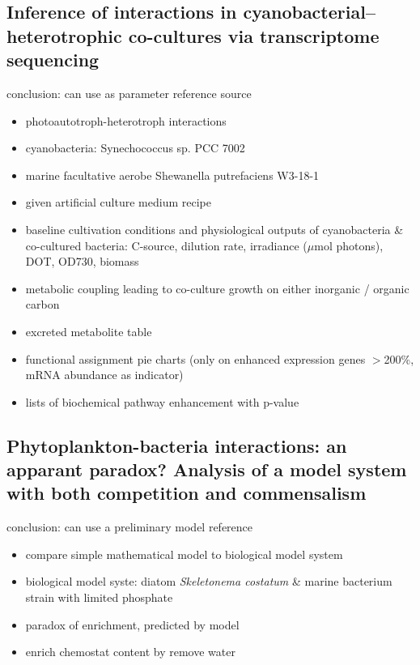 \documentclass[a4paper,11pt]{article}
\begin{document}
    \subsection{Inference of interactions in cyanobacterial– heterotrophic co-cultures via transcriptome sequencing}
    conclusion\autocite{beliaev2014inference}: can use as parameter reference source
    \begin{itemize}
        \item photoautotroph-heterotroph interactions
        \item cyanobacteria: Synechococcus sp. PCC 7002
        \item marine facultative aerobe Shewanella putrefaciens W3-18-1
        \item given artificial culture medium recipe
        \item baseline cultivation conditions and physiological outputs of cyanobacteria \& co-cultured bacteria: C-source, dilution rate, irradiance ($\mu$mol photons), DOT, OD730, biomass
        \item metabolic coupling leading to co-culture growth on either inorganic / organic carbon
        \item excreted metabolite table
        \item functional assignment pie charts (only on enhanced expression genes $>$200\%, mRNA abundance as indicator)
        \item lists of biochemical pathway enhancement with p-value
    \end{itemize}
    
    \subsection{Phytoplankton-bacteria interactions: an apparant paradox? Analysis of a model system with both competition and commensalism}
    conclusion\autocite{bratbak1985phytoplankton}: can use a preliminary model reference
    \begin{itemize}
        \item compare simple mathematical model to biological model system
        \item biological model syste: diatom \textit{Skeletonema costatum} \& marine bacterium strain with limited phosphate
        \item paradox of enrichment, predicted by model
        \item enrich chemostat content by remove water
    \end{itemize}
    
\end{document}
